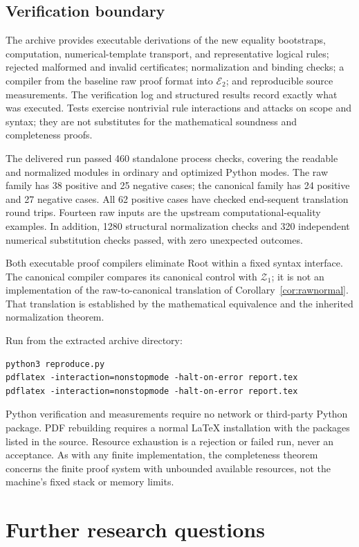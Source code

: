 \documentclass[11pt]{article}
\theoremstyle{definition}\newtheorem{definition}[theorem]{Definition}
\newcommand{\Rtwo}{\mathcal E_2}
\newcommand{\Zone}{\mathcal Z_1}
\begin{document}
\subsection{Verification boundary}

The archive provides executable derivations of the new equality
bootstraps, computation, numerical-template transport, and representative
logical rules; rejected malformed and invalid certificates; normalization
and binding checks; a compiler from the baseline raw proof format into
$\Rtwo$; and reproducible source measurements. The verification log and
structured results record exactly what was executed. Tests exercise
nontrivial rule interactions and attacks on scope and syntax; they are
not substitutes for the mathematical soundness and completeness proofs.

The delivered run passed 460 standalone process checks, covering the
readable and normalized modules in ordinary and optimized Python modes.
The raw family has 38 positive and 25 negative cases; the canonical
family has 24 positive and 27 negative cases. All 62 positive cases have
checked end-sequent translation round trips. Fourteen raw inputs are
the upstream computational-equality examples. In addition, 1280
structural normalization checks and 320 independent numerical
substitution checks passed, with zero unexpected outcomes.

Both executable proof compilers eliminate Root within a fixed syntax
interface. The canonical compiler compares its canonical control with
$\Zone$; it is not an implementation of the raw-to-canonical translation
of Corollary~\ref{cor:rawnormal}. That translation is established by the
mathematical equivalence and the inherited normalization theorem.

Run from the extracted archive directory:
\begin{lstlisting}[language={}]
python3 reproduce.py
pdflatex -interaction=nonstopmode -halt-on-error report.tex
pdflatex -interaction=nonstopmode -halt-on-error report.tex
\end{lstlisting}
Python verification and measurements require no network or third-party
Python package. PDF rebuilding requires a normal LaTeX installation with
the packages listed in the source. Resource exhaustion is a rejection
or failed run, never an acceptance. As with any finite implementation,
the completeness theorem concerns the finite proof system with
unbounded available resources, not the machine's fixed stack or memory
limits.

\section{Further research questions}
\end{document}
